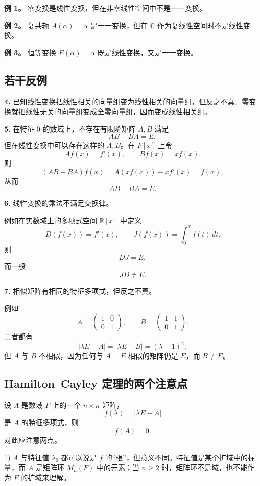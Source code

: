 \textbf{例 1。} 零变换是线性变换，但在非零线性空间中不是一一变换。

\textbf{例 2。} 复共轭 $A(\alpha)=\bar\alpha$ 是一一变换，但在 $\mathbb C$ 作为复线性空间时不是线性变换。

\textbf{例 3。} 恒等变换 $E(\alpha)=\alpha$ 既是线性变换，又是一一变换。

\subsection{若干反例}

\textbf{4.} 已知线性变换把线性相关的向量组变为线性相关的向量组，但反之不真。零变换就把线性无关的向量组变成全零向量组，因而变成线性相关组。

\textbf{5.} 在特征 $0$ 的数域上，不存在有限阶矩阵 $A,B$ 满足
\[
AB-BA=E,
\]
但在线性变换中可以存在这样的 $A,B$。在 $F[x]$ 上令
\[
Af(x)=f'(x),
\qquad
Bf(x)=xf(x).
\]
则
\[
(AB-BA)f(x)=A(xf(x))-x f'(x)=f(x),
\]
从而
\[
AB-BA=E.
\]

\textbf{6.} 线性变换的乘法不满足交换律。

例如在实数域上的多项式空间 $\mathbb R[x]$ 中定义
\[
D(f(x))=f'(x),
\qquad
J(f(x))=\int_0^x f(t)\,dt.
\]
则
\[
DJ=E,
\]
而一般
\[
JD\ne E.
\]

\textbf{7.} 相似矩阵有相同的特征多项式，但反之不真。

例如
\[
A=\begin{pmatrix}1&0\\0&1\end{pmatrix},
\qquad
B=\begin{pmatrix}1&1\\0&1\end{pmatrix}.
\]
二者都有
\[
|\lambda E-A|=|\lambda E-B|=(\lambda-1)^2,
\]
但 $A$ 与 $B$ 不相似，因为任何与 $A=E$ 相似的矩阵仍是 $E$，而 $B\ne E$。

\subsection{Hamilton--Cayley 定理的两个注意点}

设 $A$ 是数域 $F$ 上的一个 $n\times n$ 矩阵，
\[
f(\lambda)=|\lambda E-A|
\]
是 $A$ 的特征多项式，则
\[
f(A)=0.
\]
对此应注意两点。

1) $A$ 与特征值 $\lambda_0$ 都可以说是 $f$ 的“根”，但意义不同。特征值是某个扩域中的标量，而 $A$ 是矩阵环 $M_n(F)$ 中的元素；当 $n\ge2$ 时，矩阵环不是域，也不能作为 $F$ 的扩域来理解。

